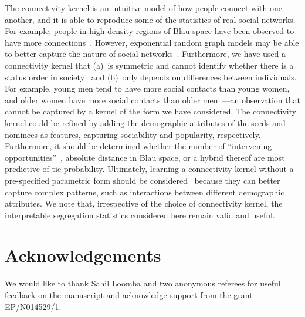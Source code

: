 \documentclass{scrartcl}
\begin{document}
\begin{refsection}
The connectivity kernel is an intuitive model of how people connect with one another, and it is able to reproduce some of the statistics of real social networks. For example, people in high-density regions of Blau space have been observed to have more connections~\cite{Currarini2009}. However, exponential random graph models may be able to better capture the nature of social networks~\cite{Wimmer2010}. Furthermore, we have used a connectivity kernel that (a)~is symmetric and cannot identify whether there is a status order in society~\cite{Chan2004,Ball2013} and (b)~only depends on differences between individuals. For example, young men tend to have more social contacts than young women, and older women have more social contacts than older men~\cite{Bhattacharya2016}---an observation that cannot be captured by a kernel of the form we have considered. The connectivity kernel could be refined by adding the demographic attributes of the seeds and nominees as features, capturing sociability and popularity, respectively. Furthermore, it should be determined whether the number of ``intervening opportunities''~\cite{Stouffer1940}, absolute distance in Blau space, or a hybrid thereof are most predictive of tie probability. Ultimately, learning a connectivity kernel without a pre-specified parametric form should be considered~\cite{Frolich2006} because they can better capture complex patterns, such as interactions between different demographic attributes. We note that, irrespective of the choice of connectivity kernel, the interpretable segregation statistics considered here remain valid and useful.

\section*{Acknowledgements}

We would like to thank Sahil Loomba and two anonymous referees for useful feedback on the manuscript and acknowledge support from the grant EP/N014529/1.

\printbibliography
\end{refsection}


\end{document}
